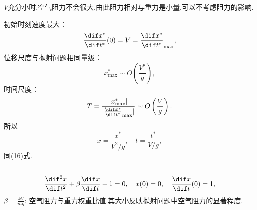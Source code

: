 \documentclass[12pt]{article}
\begin{document}
$V$充分小时,空气阻力不会很大,由此阻力相对与重力是小量,可以不考虑阻力的影响.

初始时刻速度最大：
\begin{equation}
	\frac{\dif x^*}{\dif t^*}(0) = V = \frac{\dif x^*}{\dif t^*}_{\max}	,
\end{equation}
位移尺度与抛射问题相同量级：	
\begin{equation}
	x^*_{\max}\sim O\left(\frac{V^2}{g}\right),
\end{equation}
时间尺度：
\begin{equation}
	T = \frac{|x^*_{\max}|}{|\frac{\dif x^*}{\dif t^*}_{\max}|}\sim O\left(\frac{V}{g}\right).
\end{equation}
所以
\begin{equation}
	x = \frac{x^*}{V^2/g},\quad t = \frac{t^*}{V/g},
\end{equation}
同(16)式.
	
\subsection{}

\begin{equation}
	\frac{\dif \,\! ^2x}{\dif t^2} + \beta \frac{\dif x}{\dif t} + 1 = 0,\quad x(0) = 0,\quad \frac{\dif x}{\dif t}(0) = 1,
\end{equation}
$\beta=\frac{kV}{mg}$: 空气阻力与重力权重比值.其大小反映抛射问题中空气阻力的显著程度.




\nocite{*}


\end{document}
